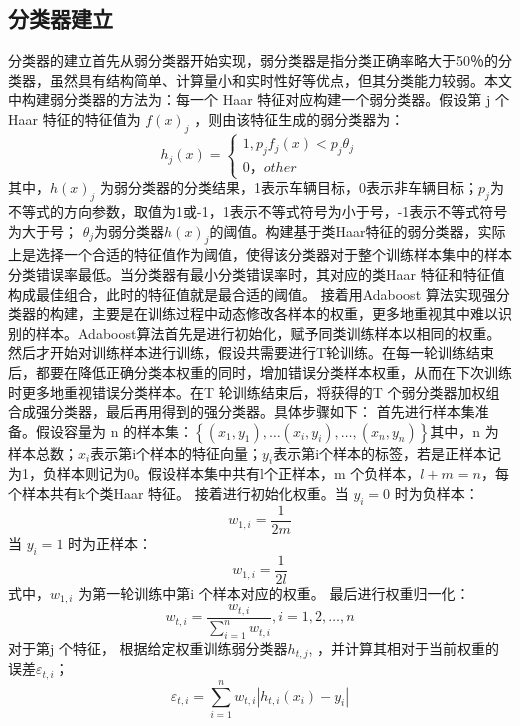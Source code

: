 \documentclass[12pt]{report}
\begin{document}
\subsection{分类器建立}
分类器的建立首先从弱分类器开始实现，弱分类器是指分类正确率略大于50％的分类器，虽然具有结构简单、计算量小和实时性好等优点，但其分类能力较弱。本文中构建弱分类器的方法为：每一个 Haar 特征对应构建一个弱分类器。假设第 j 个 Haar 特征的特征值为 $f (x)_j$ ，则由该特征生成的弱分类器为：
$$h_{j}(x)=\left\{\begin{array}{l}{1, p_{j} f_{j}(x)<p_{j} \theta_{j}} \\ {0，other}\end{array}\right.$$
其中，$h (x)_j$ 为弱分类器的分类结果，1表示车辆目标，0表示非车辆目标；$p_j$为不等式的方向参数，取值为1或-1，1表示不等式符号为小于号，-1表示不等式符号为大于号； $\theta_j$为弱分类器$h (x)_j$的阈值。构建基于类Haar特征的弱分类器，实际上是选择一个合适的特征值作为阈值，使得该分类器对于整个训练样本集中的样本分类错误率最低。当分类器有最小分类错误率时，其对应的类Haar 特征和特征值构成最佳组合，此时的特征值就是最合适的阈值。
\newline\newline
接着用Adaboost 算法实现强分类器的构建，主要是在训练过程中动态修改各样本的权重，更多地重视其中难以识别的样本。Adaboost算法首先是进行初始化，赋予同类训练样本以相同的权重。然后才开始对训练样本进行训练，假设共需要进行T轮训练。在每一轮训练结束后，都要在降低正确分类本权重的同时，增加错误分类样本权重，从而在下次训练时更多地重视错误分类样本。在T 轮训练结束后，将获得的T 个弱分类器加权组合成强分类器，最后再用得到的强分类器。具体步骤如下：
\newline\newline
首先进行样本集准备。假设容量为 n 的样本集：$\left\{\left(x_{1}, y_{1}\right), \ldots\left(x_{i}, y_{i}\right), \ldots,\left(x_{n}, y_{n}\right)\right\}$其中，n 为样本总数；$x_i$表示第i个样本的特征向量；$y_i$表示第i个样本的标签，若是正样本记为1，负样本则记为0。假设样本集中共有l个正样本，m 个负样本，$l +m = n$，每个样本共有k个类Haar 特征。
\newline\newline
接着进行初始化权重。当 $y_i=0$ 时为负样本：$$w_{1, i}=\frac{1}{2 m}$$当 $y_i=1$ 时为正样本：$$w_{1, i}=\frac{1}{2 l}$$式中，$w_{1,i}$ 为第一轮训练中第i 个样本对应的权重。
\newline\newline
最后进行权重归一化：$$w_{t, i}=\frac{w_{t, i}}{\sum_{i=1}^{n} w_{t, i}}, i=1,2, \ldots, n$$
对于第j 个特征， 根据给定权重训练弱分类器$h_{t,j}$, ，并计算其相对于当前权重的误差$ε_{t,i}$；$$\varepsilon_{t, i}=\sum_{i=1}^{n} w_{t, i}\left|h_{t, i}\left(x_{i}\right)-y_{i}\right|$$
\end{document}
